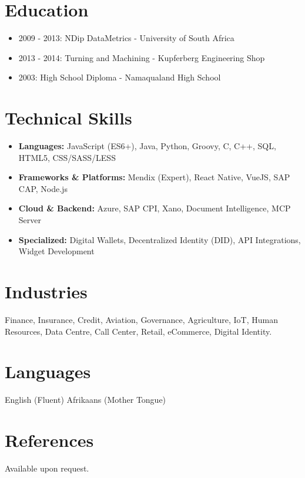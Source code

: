 \documentclass[a4paper,10pt]{article}
\begin{document}
\section{Education}

\begin{itemize}[leftmargin=*, noitemsep]
    \item 2009 - 2013: NDip DataMetrics - University of South Africa
    \item 2013 - 2014: Turning and Machining - Kupferberg Engineering Shop
    \item 2003: High School Diploma - Namaqualand High School
\end{itemize}

\section{Technical Skills}

\begin{itemize}[leftmargin=*, noitemsep]
    \item \textbf{Languages:} JavaScript (ES6+), Java, Python, Groovy, C, C++, SQL, HTML5, CSS/SASS/LESS
    \item \textbf{Frameworks \& Platforms:} Mendix (Expert), React Native, VueJS, SAP CAP, Node.js
    \item \textbf{Cloud \& Backend:} Azure, SAP CPI, Xano, Document Intelligence, MCP Server
    \item \textbf{Specialized:} Digital Wallets, Decentralized Identity (DID), API Integrations, Widget Development
\end{itemize}

\section{Industries}

Finance, Insurance, Credit, Aviation, Governance, Agriculture, IoT, Human Resources, Data Centre, Call Center, Retail, eCommerce, Digital Identity.

\section{Languages}

English (Fluent) \quad Afrikaans (Mother Tongue)

\section{References}

Available upon request.
\end{document}

